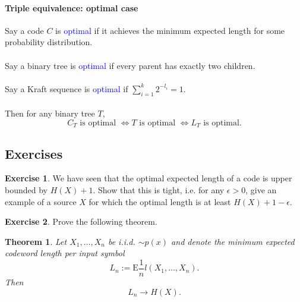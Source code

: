 \documentclass[a4paper, 11pt, openany]{book}
\numberwithin{equation}{section}
\theoremstyle{plain}
\newtheorem{theorem}	[equation]	{Theorem}
\theoremstyle{definition}
\newtheorem{exercise}   {Exercise}  [section]
\newcommand{\Structure}[1]{\textcolor{blue}{#1}}
\begin{document}
\paragraph{Triple equivalence: optimal case}

Say a code $C$ is \Structure{optimal} if it achieves the minimum expected length for some probability distribution.\\
~\\
Say a binary tree is \Structure{optimal} if every parent has exactly two children.\\
~\\
Say a Kraft sequence is \Structure{optimal} if $\sum_{i=1}^k 2^{-l_i} = 1$.\\
~\\
Then for any binary tree $T$,
\[
	C_T \text{ is optimal } \iff T \text{ is optimal } \iff  L_T \text{ is optimal}.
\]



\subsection{Exercises}


\begin{exercise}
We have seen that the optimal expected length of a code is upper bounded by $H(X) + 1$. Show that this is tight, i.e. for any $\epsilon > 0$, give an example of a source $X$ for which the optimal length is at least $H(X) + 1 - \epsilon$.
\end{exercise}



\begin{exercise}
Prove the following theorem. 

\begin{theorem}\label{th:source_coding}
Let $X_1,\ldots,X_n$ be i.i.d. $\sim p(x)$ and denote the minimum expected codeword length per input symbol
$$
	L_n := \mathrm{E} \frac{1}{n} l(X_1,\ldots,X_n).
$$
Then
$$
	L_n \to H(X).
$$
\end{theorem}

\end{exercise}
\end{document}
